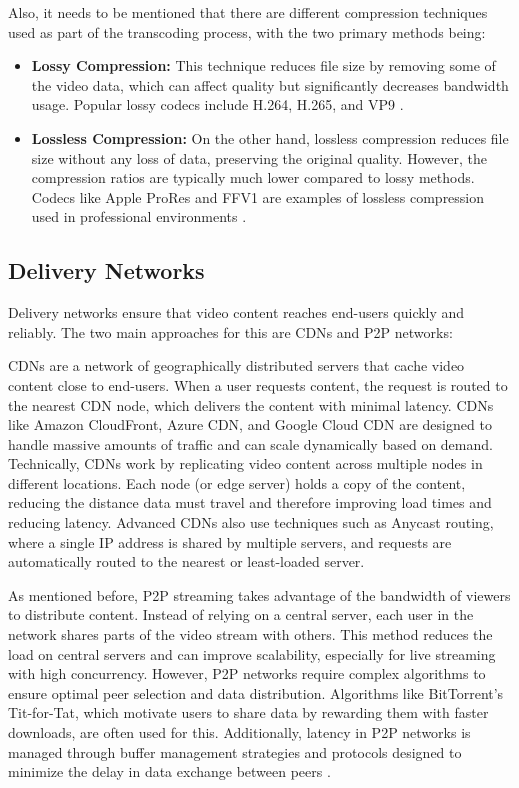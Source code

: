Also, it needs to be mentioned that there are different compression techniques used as part of the transcoding process, with the two primary methods being:

\begin{itemize}
    \item \textbf{Lossy Compression:} This technique reduces file size by removing some of the video data, which can affect quality but significantly decreases bandwidth usage. Popular lossy codecs include H.264, H.265, and VP9 \cite{lossy_compression}.
    \item \textbf{Lossless Compression:} On the other hand, lossless compression reduces file size without any loss of data, preserving the original quality. However, the compression ratios are typically much lower compared to lossy methods. Codecs like Apple ProRes and FFV1 are examples of lossless compression used in professional environments \cite{lossless_compression}.
\end{itemize}

\subsection{Delivery Networks}
Delivery networks ensure that video content reaches end-users quickly and reliably. The two main approaches for this are \ac{CDN}s and \ac{P2P} networks:

\ac{CDN}s are a network of geographically distributed servers that cache video content close to end-users. When a user requests content, the request is routed to the nearest \ac{CDN} node, which delivers the content with minimal latency. \ac{CDN}s like Amazon CloudFront, Azure CDN, and Google Cloud CDN are designed to handle massive amounts of traffic and can scale dynamically based on demand\cite{cdn_tech}.
Technically, \ac{CDN}s work by replicating video content across multiple nodes in different locations. Each node (or edge server) holds a copy of the content, reducing the distance data must travel and therefore improving load times and reducing latency. Advanced \ac{CDN}s also use techniques such as Anycast routing, where a single IP address is shared by multiple servers, and requests are automatically routed to the nearest or least-loaded server\cite{cdn_anycast}.
    
As mentioned before, \ac{P2P} streaming takes advantage of the bandwidth of viewers to distribute content. Instead of relying on a central server, each user in the network shares parts of the video stream with others. This method reduces the load on central servers and can improve scalability, especially for live streaming with high concurrency\cite{p2p_cdn}.
However, \ac{P2P} networks require complex algorithms to ensure optimal peer selection and data distribution. Algorithms like BitTorrent's Tit-for-Tat, which motivate users to share data by rewarding them with faster downloads, are often used for this. Additionally, latency in \ac{P2P} networks is managed through buffer management strategies and protocols designed to minimize the delay in data exchange between peers \cite{p2p_latency}.

